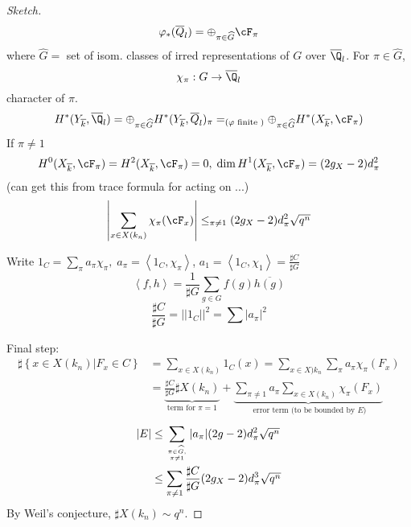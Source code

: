 \begin{proof}[Sketch]
	$$\varphi_*(\overline Q_l) = \oplus_{\pi\in \widehat G} \cF_{\pi}$$
	where $\widehat G = $ set of isom. classes of irred representations of $G$ over $\overline\Q_l$. For $\pi\in \widehat G$, 
		$$\chi_{\pi}: G\to\overline\Q_l$$
		character of $\pi$. 
	$$H^*(Y_{\overline k}, \overline\Q_l) = \oplus_{\pi\in \widehat G} H^*(Y_{\overline k}, \overline Q_l)_\pi =_{(\varphi\text{ finite })} \oplus_{\pi\in \widehat G}H^*(X_{\overline k}, \cF_\pi)$$
	If $\pi\neq 1$
	$$H^0(X_{\overline k},\cF_\pi) = H^2(X_{\overline k}, \cF_\pi)=0, \; \dim H^1(X_{\overline k}, \cF_\pi) = (2g_X-2)d_\pi^2$$
	(can get this from trace formula for acting on ...)
	$$\left|\sum_{x\in X(k_n)}\chi_\pi(\cF_x)\right|\leq_{\pi\neq 1} (2g_X-2)d_\pi^2\sqrt{q^n}$$
	
	Write $1_C = \sum_\pi a_\pi\chi_\pi, \; a_\pi=\left<1_C, \chi_\pi\right>$, $a_1 = \left<1_C, \chi_1\right> = \frac{\sharp C}{\sharp G}$
	$$\left<f, h\right> = \frac{1}{\sharp G}\sum_{g\in G}f(g)\overline{h(g)}$$
	$$\frac{\sharp C}{\sharp G} = ||1_C||^2 = \sum|a_\pi|^2$$

\noindent
Final step: 
	\begin{align*}
	\sharp\left\{x\in X(k_n)\left| F_x\in C\right.\right\}&=\sum_{x\in X(k_n)}1_C(x) = \sum_{x\in X)k_n}\sum_{\pi}a_\pi\chi_\pi(F_x)\\
	&=\underbrace{\frac{\sharp C}{\sharp G}\sharp X(k_n)}_{\text{term for }\pi=1}+\underbrace{\sum_{\pi\neq 1}a_\pi\sum_{x\in X(k_n)}\chi_\pi(F_x)}_{\text{ error term (to be bounded by $E$)}}
	\end{align*}
	\begin{align*}
	|E|&\leq \sum_{\pi\in \widehat G, \atop \pi\neq 1}|a_\pi|(2g-2)d_\pi^2\sqrt{q^n}\\
	&\leq \sum_{\pi\neq 1} \frac{\sharp C}{\sharp G} (2g_X-2)d_\pi^3\sqrt{q^n}
	\end{align*}
By Weil's conjecture, $\sharp X(k_n)\sim q^n$. 
\end{proof}

